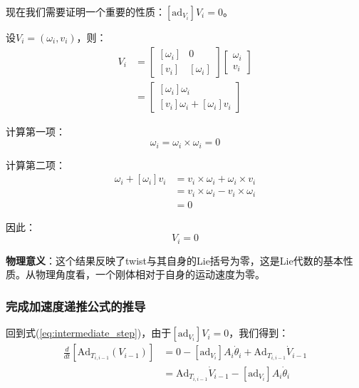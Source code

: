 \documentclass[12pt,a4paper]{article}
\begin{document}
现在我们需要证明一个重要的性质：$[\text{ad}_{V_i}] V_i = 0$。

设$V_i = (\omega_i, v_i)$，则：
\begin{align}
[\text{ad}_{V_i}] V_i &= \begin{bmatrix}
[\omega_i] & 0 \\
[v_i] & [\omega_i]
\end{bmatrix} \begin{bmatrix}
\omega_i \\
v_i
\end{bmatrix} \\
&= \begin{bmatrix}
[\omega_i] \omega_i \\
[v_i] \omega_i + [\omega_i] v_i
\end{bmatrix}
\end{align}

计算第一项：
\begin{equation}
[\omega_i] \omega_i = \omega_i \times \omega_i = 0
\end{equation}

计算第二项：
\begin{align}
[v_i] \omega_i + [\omega_i] v_i &= v_i \times \omega_i + \omega_i \times v_i \\
&= v_i \times \omega_i - v_i \times \omega_i \\
&= 0
\end{align}

因此：
\begin{equation}
[\text{ad}_{V_i}] V_i = 0
\label{eq:ad_V_V_zero}
\end{equation}

\textbf{物理意义}：这个结果反映了twist与其自身的Lie括号为零，这是Lie代数的基本性质。从物理角度看，一个刚体相对于自身的运动速度为零。

\subsubsection{完成加速度递推公式的推导}

回到式(\ref{eq:intermediate_step})，由于$[\text{ad}_{V_i}] V_i = 0$，我们得到：
\begin{align}
\frac{d}{dt}[\text{Ad}_{T_{i,i-1}}(V_{i-1})] &= 0 - [\text{ad}_{V_i}] A_i \dot{\theta}_i + \text{Ad}_{T_{i,i-1}} \dot{V}_{i-1} \\
&= \text{Ad}_{T_{i,i-1}} \dot{V}_{i-1} - [\text{ad}_{V_i}] A_i \dot{\theta}_i
\end{align}
\end{document}
